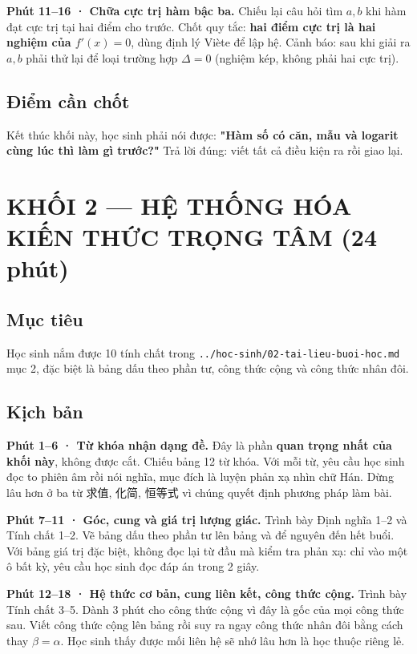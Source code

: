 \documentclass[11pt, a4paper]{article}
\begin{document}
\textbf{Phút 11–16 · Chữa cực trị hàm bậc ba.} Chiếu lại câu hỏi tìm $a, b$ khi hàm đạt cực trị tại hai điểm cho trước. Chốt quy tắc: \textbf{hai điểm cực trị là hai nghiệm của $f'(x) = 0$}, dùng định lý Viète để lập hệ. Cảnh báo: sau khi giải ra $a, b$ phải thử lại để loại trường hợp $\Delta = 0$ (nghiệm kép, không phải hai cực trị).

\subsection{Điểm cần chốt}

Kết thúc khối này, học sinh phải nói được: \textbf{"Hàm số có căn, mẫu và logarit cùng lúc thì làm gì trước?"} Trả lời đúng: viết tất cả điều kiện ra rồi giao lại.

\section{KHỐI 2 — HỆ THỐNG HÓA KIẾN THỨC TRỌNG TÂM (24 phút)}

\subsection{Mục tiêu}

Học sinh nắm được 10 tính chất trong \texttt{../hoc-sinh/02-tai-lieu-buoi-hoc.md} mục 2, đặc biệt là bảng dấu theo phần tư, công thức cộng và công thức nhân đôi.

\subsection{Kịch bản}

\textbf{Phút 1–6 · Từ khóa nhận dạng đề.} Đây là phần \textbf{quan trọng nhất của khối này}, không được cắt. Chiếu bảng 12 từ khóa. Với mỗi từ, yêu cầu học sinh đọc to phiên âm rồi nói nghĩa, mục đích là luyện phản xạ nhìn chữ Hán. Dừng lâu hơn ở ba từ 求值, 化简, 恒等式 vì chúng quyết định phương pháp làm bài.

\textbf{Phút 7–11 · Góc, cung và giá trị lượng giác.} Trình bày Định nghĩa 1–2 và Tính chất 1–2. Vẽ bảng dấu theo phần tư lên bảng và để nguyên đến hết buổi. Với bảng giá trị đặc biệt, không đọc lại từ đầu mà kiểm tra phản xạ: chỉ vào một ô bất kỳ, yêu cầu học sinh đọc đáp án trong 2 giây.

\textbf{Phút 12–18 · Hệ thức cơ bản, cung liên kết, công thức cộng.} Trình bày Tính chất 3–5. Dành 3 phút cho công thức cộng vì đây là gốc của mọi công thức sau. Viết công thức cộng lên bảng rồi suy ra ngay công thức nhân đôi bằng cách thay $\beta = \alpha$. Học sinh thấy được mối liên hệ sẽ nhớ lâu hơn là học thuộc riêng lẻ.
\end{document}
